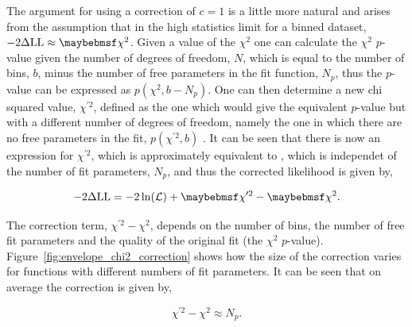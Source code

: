 The argument for using a correction of $c=1$ is a little more natural and arises from the assumption that in the high statistics limit for a binned dataset, $\NLL\approx\chi^{2}$. Given a value of the $\chi^{2}$ one can calculate the $\chi^{2}$ $p$-value given the number of degrees of freedom, $N$, which is equal to the number of bins, $b$, minus the number of free parameters in the fit function, $N_{p}$, thus the $p$-value can be expressed as $p(\chi^{2},b-N_{p})$. One can then determine a new chi squared value, $\chi^{\prime 2}$, defined as the one which would give the equivalent $p$-value but with a different number of degrees of freedom, namely the one in which there are no free parameters in the fit, $p(\chi^{\prime 2},b)$ . It can be seen that there is now an expression for $\chi^{\prime 2}$, which is approximately equivalent to \NLL, which is independet of the number of fit parameters, $N_{p}$, and thus the corrected likelihood is given by,

\begin{equation}
  \NLL = -2\ln(\mathcal{L}) + \chi^{\prime 2} - \chi^{2}.
\end{equation}

The correction term, $\chi^{\prime 2} -\chi^{2}$, depends on the number of bins, the number of free fit parameters and the quality of the original fit (the $\chi^{2}$ $p$-value). Figure~\ref{fig:envelope_chi2_correction} shows how the size of the correction varies for functions with different numbers of fit parameters. It can be seen that on average the correction is given by,

\begin{equation}
  \chi^{\prime 2} - \chi^{2} \approx N_{p}.
\end{equation}

